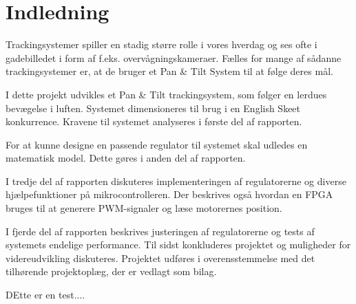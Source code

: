 \section*{Indledning}
Trackingsystemer spiller en stadig større rolle i vores hverdag og ses ofte i gadebilledet i form 
af f.eks. overvågningskameraer.
Fælles for mange af sådanne trackingsystemer er, at de bruger et Pan \& Tilt System til at følge deres mål. 

I dette projekt udvikles et Pan \& Tilt trackingsystem, som følger en lerdues bevægelse i 
luften. Systemet dimensioneres til brug i en English Skeet konkurrence. Kravene til systemet analyseres i første del af rapporten. 

For at kunne designe en passende regulator til systemet skal udledes en matematisk model. Dette gøres i anden del af rapporten. 

I tredje del af rapporten diskuteres implementeringen af regulatorerne og diverse hjælpefunktioner på mikrocontrolleren. Der beskrives også hvordan en FPGA bruges til at generere PWM-signaler og læse motorernes position. 

I fjerde del af rapporten beskrives justeringen af regulatorerne og tests af systemets endelige performance.
Til sidst konkluderes projektet og muligheder for videreudvikling diskuteres.
Projektet udføres i overensstemmelse med det tilhørende projektoplæg, der er vedlagt 
som bilag.



DEtte er en test....